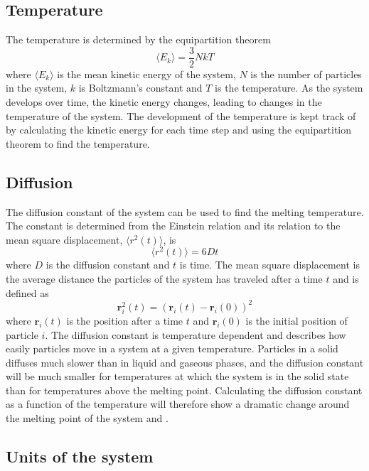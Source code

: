 \documentclass{article}
\begin{document}
\subsection{Temperature}
The temperature is determined by the equipartition theorem
$$\langle E_k\rangle=\frac{3}{2}NkT$$
where $\langle E_k\rangle$ is the mean kinetic energy of the system, $N$ is the number of particles in the system, $k$ is Boltzmann's constant and $T$ is the temperature. As the system develops over time, the kinetic energy changes, leading to changes in the temperature of the system. The development of the temperature is kept track of by calculating the kinetic energy for each time step and using the equipartition theorem to find the temperature.


\subsection{Diffusion}
The diffusion constant of the system can be used to find the melting temperature. The constant is determined from the Einstein relation and its relation to the mean square displacement, $\langle r^2(t)\rangle$, is
$$\langle r^2(t)\rangle = 6Dt$$
where $D$ is the diffusion constant and $t$ is time. The mean square displacement is the average distance the particles of the system has traveled after a time $t$ and is defined as
$$\mathbf{r}_i^2(t)=(\mathbf{r}_i(t)-\mathbf{r}_i(0))^2$$
where $\mathbf{r}_i(t)$ is the position after a time $t$ and $\mathbf{r}_i(0)$ is the initial position of particle $i$. The diffusion constant is temperature dependent and describes how easily particles move in a system at a given temperature. Particles in a solid diffuses much slower than in liquid and gaseous phases, and the diffusion constant will be much smaller for temperatures at which the system is in the solid state than for temperatures above the melting point. Calculating the diffusion constant as a function of the temperature will therefore show a dramatic change around the melting point of the system and .


\subsection{Units of the system}
\end{document}
